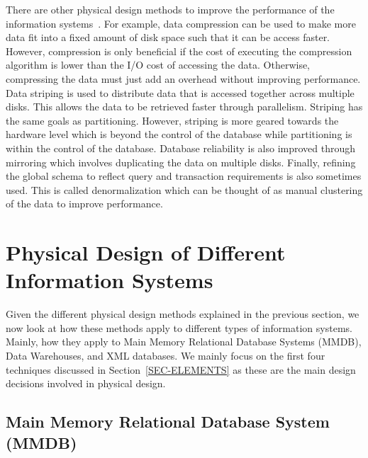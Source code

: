 \documentclass[12pt,a4paper]{article}
\begin{document}
There are other physical design methods to improve the performance of the information systems~\cite{lightstone2007physical}. For example, data compression can
be used to make more data fit into a fixed amount of disk space such that it can be access faster. However, compression is only beneficial if the cost of
executing the compression algorithm is lower than the I/O cost of accessing the data. Otherwise, compressing the data must just add an overhead without
improving performance. Data striping is used to distribute data that is accessed together across multiple disks. This allows the data
to be retrieved faster through parallelism. Striping has the same goals as partitioning. However, striping is more geared towards the hardware level
which is beyond the control of the database while partitioning is within the control of the database. Database reliability is also improved through mirroring
which involves duplicating the data on multiple disks. Finally, refining the global schema to reflect query and transaction requirements is also sometimes used.
This is called denormalization which can be thought of as manual clustering of the data to improve performance.

\section{Physical Design of Different Information Systems}
\label{SEC-DIFFSYS}

Given the different physical design methods explained in the previous section, we now look at how these methods apply to different types of information systems.
Mainly, how they apply to Main Memory Relational Database Systems (MMDB), Data Warehouses, and XML databases. We mainly focus
on the first four techniques discussed in Section~\ref{SEC-ELEMENTS} as these are the main design decisions involved in physical design.

\subsection{Main Memory Relational Database System (MMDB)}
\label{SEC-MMDB}
\end{document}
